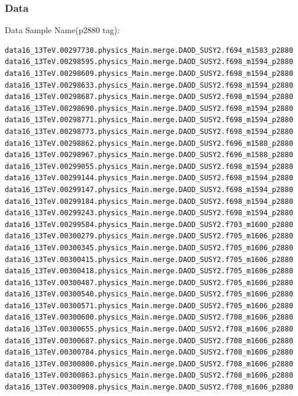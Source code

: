\documentclass[mathserif,serif]{beamer}
\begin{document}
\begin{frame}[fragile]
\frametitle{Data}
\small
Data Sample Name(p2880 tag):
\tiny
\begin{verbatim}
data16_13TeV.00297730.physics_Main.merge.DAOD_SUSY2.f694_m1583_p2880
data16_13TeV.00298595.physics_Main.merge.DAOD_SUSY2.f698_m1594_p2880
data16_13TeV.00298609.physics_Main.merge.DAOD_SUSY2.f698_m1594_p2880
data16_13TeV.00298633.physics_Main.merge.DAOD_SUSY2.f698_m1594_p2880
data16_13TeV.00298687.physics_Main.merge.DAOD_SUSY2.f698_m1594_p2880
data16_13TeV.00298690.physics_Main.merge.DAOD_SUSY2.f698_m1594_p2880
data16_13TeV.00298771.physics_Main.merge.DAOD_SUSY2.f698_m1594_p2880
data16_13TeV.00298773.physics_Main.merge.DAOD_SUSY2.f698_m1594_p2880
data16_13TeV.00298862.physics_Main.merge.DAOD_SUSY2.f696_m1588_p2880
data16_13TeV.00298967.physics_Main.merge.DAOD_SUSY2.f696_m1588_p2880
data16_13TeV.00299055.physics_Main.merge.DAOD_SUSY2.f698_m1594_p2880
data16_13TeV.00299144.physics_Main.merge.DAOD_SUSY2.f698_m1594_p2880
data16_13TeV.00299147.physics_Main.merge.DAOD_SUSY2.f698_m1594_p2880
data16_13TeV.00299184.physics_Main.merge.DAOD_SUSY2.f698_m1594_p2880
data16_13TeV.00299243.physics_Main.merge.DAOD_SUSY2.f698_m1594_p2880
data16_13TeV.00299584.physics_Main.merge.DAOD_SUSY2.f703_m1600_p2880
data16_13TeV.00300279.physics_Main.merge.DAOD_SUSY2.f705_m1606_p2880
data16_13TeV.00300345.physics_Main.merge.DAOD_SUSY2.f705_m1606_p2880
data16_13TeV.00300415.physics_Main.merge.DAOD_SUSY2.f705_m1606_p2880
data16_13TeV.00300418.physics_Main.merge.DAOD_SUSY2.f705_m1606_p2880
data16_13TeV.00300487.physics_Main.merge.DAOD_SUSY2.f705_m1606_p2880
data16_13TeV.00300540.physics_Main.merge.DAOD_SUSY2.f705_m1606_p2880
data16_13TeV.00300571.physics_Main.merge.DAOD_SUSY2.f705_m1606_p2880
data16_13TeV.00300600.physics_Main.merge.DAOD_SUSY2.f708_m1606_p2880
data16_13TeV.00300655.physics_Main.merge.DAOD_SUSY2.f708_m1606_p2880
data16_13TeV.00300687.physics_Main.merge.DAOD_SUSY2.f708_m1606_p2880
data16_13TeV.00300784.physics_Main.merge.DAOD_SUSY2.f708_m1606_p2880
data16_13TeV.00300800.physics_Main.merge.DAOD_SUSY2.f708_m1606_p2880
data16_13TeV.00300863.physics_Main.merge.DAOD_SUSY2.f708_m1606_p2880
data16_13TeV.00300908.physics_Main.merge.DAOD_SUSY2.f708_m1606_p2880
\end{verbatim}
\end{frame}
\end{document}
